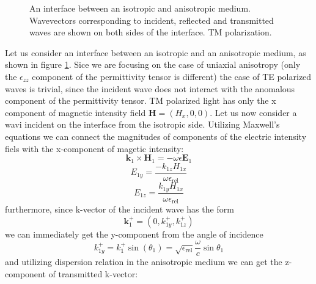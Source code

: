 \documentclass[a4paper]{scrartcl}
\begin{document}
\begin{figure}[b!]
\caption{An interface between an isotropic and anisotropic medium. Wavevectors corresponding to incident, reflected and transmitted waves are shown
on both sides of the interface. TM polarization.}
\label{Fig. 1}
\end{figure}
Let us consider an interface between an isotropic and an anisotropic medium, as shown in figure \ref{Fig. 1}. Sice we
are focusing on the case of uniaxial anisotropy (only the $\epsilon_{zz}$ component of the permittivity tensor is
different) the case of TE polarized waves is trivial, since the incident wave does not interact with the anomalous
component of the permittivity tensor. TM polarized light has only the x component of magnetic intensity field
$\mathbf{H}=(H_x,0,0)$.
Let us now consider a wavi incident on the interface from the isotropic side.
Utilizing Maxwell's equations we can connect the magnitudes of components of the electric intensity fiels with the
x-component of magetic intensity:
\begin{equation}
      \mathbf{k}_1 \times \mathbf{H}_1 = -\omega\epsilon\mathbf{E}_1
\end{equation}
\begin{equation}
      E_{1y} = \dfrac{-k_{1z} H_{1x}}{\omega \epsilon_\textrm{rel}}
\end{equation}
\begin{equation}
      E_{1z} = \dfrac{k_{1y} H_{1x}}{\omega \epsilon_\textrm{rel}}
\end{equation}
furthermore, since k-vector of the incident wave has the form
\begin{equation}
      \mathbf{k}_1^+ = (0,k_{1y}^+,k_{1z}^+)
\end{equation}
we can immediately get the y-component from the angle of incidence
\begin{equation}
      k_{1y}^+ = k_1^+ \sin(\theta_1) = \sqrt{\epsilon_\textrm{rel}}\dfrac{\omega}{c} \sin\theta_1
\end{equation}
and utilizing dispersion relation in the anisotropic medium we can get the z-component of transmitted k-vector:
\end{document}
